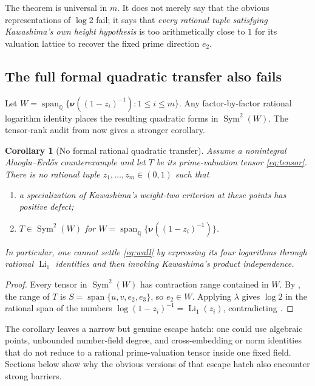 \documentclass[11pt]{article}
\newtheorem{corollary}[theorem]{Corollary}
\theoremstyle{definition}
\newcommand{\Q}{\mathbb Q}
\newcommand{\Li}{\operatorname{Li}}
\newcommand{\Span}{\operatorname{span}}
\newcommand{\val}{\boldsymbol\nu}
\begin{document}
\begin{provedbox}
The theorem is universal in $m$.  It does not merely say that the obvious representations of
$\log2$ fail; it says that \emph{every rational tuple satisfying Kawashima's own height
hypothesis} is too arithmetically close to $1$ for its valuation lattice to recover the fixed
prime direction $e_2$.
\end{provedbox}

\subsection{The full formal quadratic transfer also fails}

Let $W=\Span_\Q\{\val((1-z_i)^{-1}):1\le i\le m\}$.  Any factor-by-factor rational
logarithm identity places the resulting quadratic forms in $\operatorname{Sym}^2(W)$.
The tensor-rank audit from  now gives a stronger corollary.

\begin{corollary}[No formal rational quadratic transfer]\label{cor:quadratic-transfer}
Assume a nonintegral Alaoglu--Erd\H{o}s counterexample and let $T$ be its prime-valuation
tensor \eqref{eq:tensor}.  There is no rational tuple $z_1,\ldots,z_m\in(0,1)$ such that
\begin{enumerate}[label=\textup{(\roman*)}]
\item a specialization of Kawashima's weight-two criterion at these points has positive defect;
\item $T\in\operatorname{Sym}^2(W)$ for
$W=\Span_\Q\{\val((1-z_i)^{-1})\}$.
\end{enumerate}
In particular, one cannot settle \eqref{eq:wall} by expressing its four logarithms through
rational $\Li_1$ identities and then invoking Kawashima's product independence.
\end{corollary}

\begin{proof}
Every tensor in $\operatorname{Sym}^2(W)$ has contraction range contained in $W$.
By , the range of $T$ is
$S=\Span\{u,v,e_2,e_3\}$, so $e_2\in W$.  Applying $\lambda$ gives
$\log2$ in the rational span of the numbers $\log(1-z_i)^{-1}=\Li_1(z_i)$, contradicting
.
\end{proof}

The corollary leaves a narrow but genuine escape hatch: one could use algebraic points,
unbounded number-field degree, and cross-embedding or norm identities that do not reduce to a
rational prime-valuation tensor inside one fixed field.  Sections below show why the obvious
versions of that escape hatch also encounter strong barriers.
\end{document}
